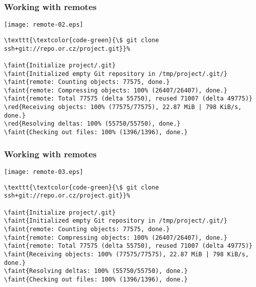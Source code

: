 \documentclass[english]{beamer}
\newcommand{\CMD}[1]{%
\texttt{\textcolor{code-green}{#1}}%
}
\newcommand{\faint}[1]{%
\textcolor{code-gray}{#1}%
}
\newcommand{\red}[1]{%
\textcolor{code-red}{#1}%
}
\begin{document}
\begin{frame}[fragile]
\frametitle{Working with remotes}

\texttt{[image: remote-02.eps]}

{\tiny
\begin{Verbatim}[commandchars=\\\{\}]
\CMD{\$ git clone ssh+git://repo.or.cz/project.git}
\faint{Initialize project/.git}
\faint{Initialized empty Git repository in /tmp/project/.git/}
\faint{remote: Counting objects: 77575, done.}
\faint{remote: Compressing objects: 100% (26407/26407), done.}
\faint{remote: Total 77575 (delta 55750), reused 71007 (delta 49775)}
\red{Receiving objects: 100% (77575/77575), 22.87 MiB | 798 KiB/s, done.}
\red{Resolving deltas: 100% (55750/55750), done.}
\faint{Checking out files: 100% (1396/1396), done.}
\end{Verbatim}
}
\vspace{\textheight}
\end{frame}

\begin{frame}[fragile]
\frametitle{Working with remotes}

\texttt{[image: remote-03.eps]}

{\tiny
\begin{Verbatim}[commandchars=\\\{\}]
\CMD{\$ git clone ssh+git://repo.or.cz/project.git}
\faint{Initialize project/.git}
\faint{Initialized empty Git repository in /tmp/project/.git/}
\faint{remote: Counting objects: 77575, done.}
\faint{remote: Compressing objects: 100% (26407/26407), done.}
\faint{remote: Total 77575 (delta 55750), reused 71007 (delta 49775)}
\faint{Receiving objects: 100% (77575/77575), 22.87 MiB | 798 KiB/s, done.}
\faint{Resolving deltas: 100% (55750/55750), done.}
\faint{Checking out files: 100% (1396/1396), done.}
\end{Verbatim}
}
\vspace{\textheight}
\end{frame}
\end{document}
